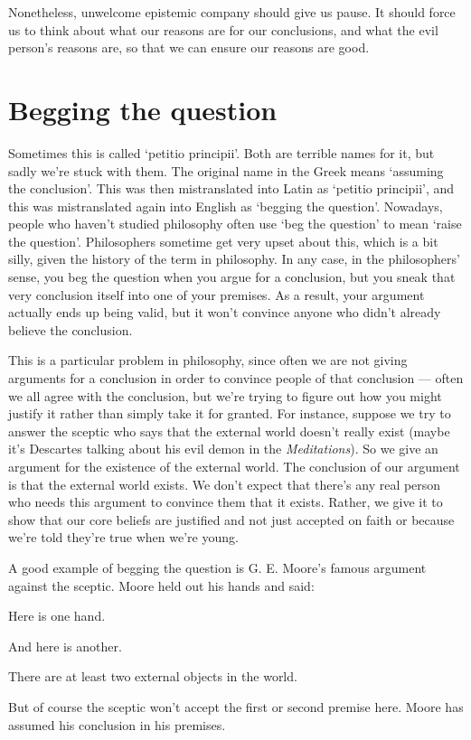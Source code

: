Nonetheless, unwelcome epistemic company should give us pause. It should force us to think about what our reasons are for our conclusions, and what the evil person's reasons are, so that we can ensure our reasons are good.

\section{Begging the question}

Sometimes this is called `petitio principii'. Both are terrible names for it, but sadly we're stuck with them. The original name in the Greek means `assuming the conclusion'. This was then mistranslated into Latin as `petitio principii', and this was mistranslated again into English as `begging the question'. Nowadays, people who haven't studied philosophy often use `beg the question' to mean `raise the question'. Philosophers sometime get very upset about this, which is a bit silly, given the history of the term in philosophy. In any case, in the philosophers' sense, you beg the question when you argue for a conclusion, but you sneak that very conclusion itself into one of your premises. As a result, your argument actually ends up being valid, but it won't convince anyone who didn't already believe the conclusion.

This is a particular problem in philosophy, since often we are not giving arguments for a conclusion in order to convince people of that conclusion --- often we all agree with the conclusion, but we're trying to figure out how you might justify it rather than simply take it for granted. For instance, suppose we try to answer the sceptic who says that the external world doesn't really exist (maybe it's Descartes talking about his evil demon in the \emph{Meditations}). So we give an argument for the existence of the external world. The conclusion of our argument is that the external world exists. We don't expect that there's any real person who needs this argument to convince them that it exists. Rather, we give it to show that our core beliefs are justified and not just accepted on faith or because we're told they're true when we're young. 

A good example of begging the question is G. E. Moore's famous argument against the sceptic. Moore held out his hands and said:
\begin{earg}
\prem Here is one hand.

\prem And here is another.

\conc There are at least two external objects in the world.
\end{earg}
But of course the sceptic won't accept the first or second premise here. Moore has assumed his conclusion in his premises.

